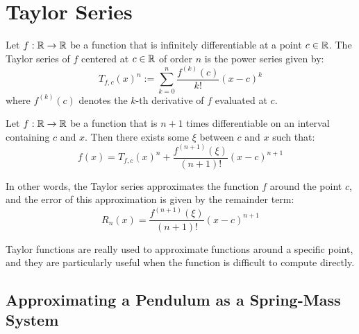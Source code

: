 \section{Taylor Series}

\begin{definicion}
    Let $f:\mathbb{R}\to \mathbb{R}$ be a function that is infinitely differentiable at a point $c\in \mathbb{R}$. The Taylor series of $f$ centered at $c\in \mathbb{R}$ of order $n$ is the power series given by:
\[
    T_{f,c}(x)^n := \sum\limits_{k=0}^n \frac{f^{(k)}(c)}{k!} (x - c)^k
\]
where $f^{(k)}(c)$ denotes the $k$-th derivative of $f$ evaluated at $c$.
\end{definicion}

\begin{teo}
    Let $f:\mathbb{R}\to \mathbb{R}$ be a function that is $n+1$ times differentiable on an interval containing $c$ and $x$. Then there exists some $\xi$ between $c$ and $x$ such that:
    \[
    f(x) = T_{f,c}(x)^n + \frac{f^{(n+1)}(\xi)}{(n+1)!} (x - c)^{n+1}
    \]
\end{teo}

In other words, the Taylor series approximates the function $f$ around the point $c$, and the error of this approximation is given by the remainder term:
\[
    R_n(x) = \frac{f^{(n+1)}(\xi)}{(n+1)!} (x - c)^{n+1}
\]

Taylor functions are really used to approximate functions around a specific point, and they are particularly useful when the function is difficult to compute directly.
\subsection{Approximating a Pendulum as a Spring-Mass System}

